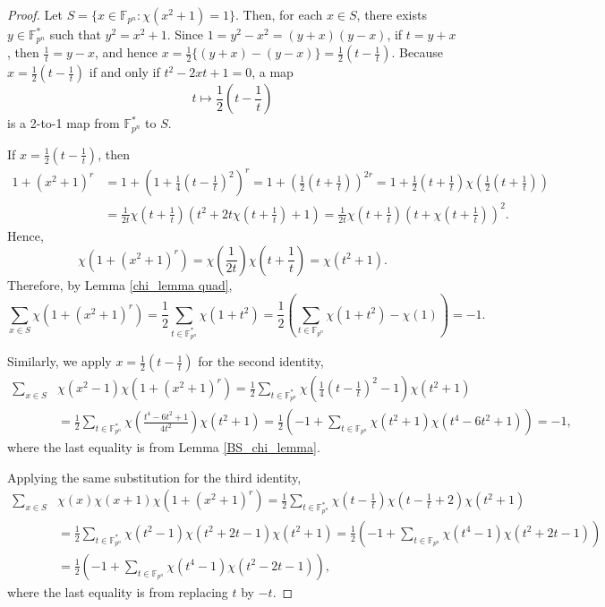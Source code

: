 \documentclass[11pt]{article}
\numberwithin{theorem}{section}
\newcommand{\Sum}{\displaystyle \sum}
\newcommand{\Fpn}{\mathbb{F}_{p^n}}
\newcommand{\Fpnmul}{\mathbb{F}_{p^n}^*}
\begin{document}
\begin{proof}
	Let $S=\{x\in \Fpn : \chi(x^2+1)=1\}$. Then, for each $x\in S$, there exists $y\in \Fpnmul$ such that $y^2 = x^2+1$. Since $1=y^2-x^2 = (y+x)(y-x)$, if $t=y+x$, then $\frac{1}{t} = y-x$, and hence $x = \frac{1}{2}\{(y+x)-(y-x)\} = \frac{1}{2}\left( t - \frac{1}{t}\right)$. Because $x= \frac{1}{2}\left( t - \frac{1}{t}\right)$ if and only if $t^2-2xt+1=0$, a map 
	$$t \mapsto \frac{1}{2}\left( t - \frac{1}{t}\right)$$
	is a 2-to-1 map from $\Fpnmul$ to $S$.
	
	If $x= \frac{1}{2}\left( t - \frac{1}{t}\right)$, then
	\begin{align*}
		1 + (x^2+1)^r &= 1 +\left( 1+\frac{1}{4}\left( t - \frac{1}{t}\right)^2\right)^r 
		= 1 +\left( \frac{1}{2}\left( t + \frac{1}{t }\right) \right)^{2r} =  1 +\frac{1}{2}\left( t + \frac{1}{t}\right)\chi\left( \frac{1}{2}\left( t + \frac{1}{t }\right)\right) \\
		& = \frac{1}{2t}\chi\left( t + \frac{1}{t }\right)\left( t^2 +2t\chi\left( t + \frac{1}{t }\right) +1 \right)  = \frac{1}{2t}\chi\left( t + \frac{1}{t }\right) \left( t+\chi\left( t + \frac{1}{t }\right)\right) ^2.
	\end{align*}
	Hence,
	\begin{equation*}
		\chi\left(1 + (x^2+1)^r \right)  = \chi \left( \frac{1}{2t}\right) \chi\left( t + \frac{1}{t }\right)  = \chi (t^2+1).
	\end{equation*}
	Therefore, by Lemma \ref{chi_lemma quad},
	\begin{equation*}
		\Sum_{x\in S}\chi(1+(x^2+1)^r) =  \frac{1}{2}\Sum_{t\in \Fpnmul}\chi(1+t^2) = \frac{1}{2}\left( \Sum_{t\in \Fpn}\chi(1+t^2) - \chi(1)\right) =-1.
	\end{equation*}
	
	Similarly, we apply $x =  \frac{1}{2 }\left( t- \frac {1}{t}\right)$ for the second identity,
	\begin{align*}
		\Sum_{x\in S}&\chi(x^2-1)\chi(1+(x^2+1)^r) = \frac{1}{2}\Sum_{t\in \Fpnmul} \chi\left( \frac{1}{4}\left( t- \frac {1}{t}\right) ^2-1\right)  \chi(t^2+1) \\
		&= \frac{1}{2}\Sum_{t\in \Fpnmul} \chi\left(\frac{t^4-6t^2+1}{4t^2} \right)\chi(t^2+1)
		= \frac{1}{2}\left( -1+\Sum_{t\in \Fpn} \chi(t^2+1) \chi(t^4-6t^2+1) \right)=-1, 
	\end{align*}
	where the last equality is from Lemma \ref{BS_chi_lemma}.
	
	Applying the same substitution for the third identity,
	\begin{align*}
		\Sum_{x\in S}&\chi(x)\chi(x+1)\chi(1+(x^2+1)^r) = \frac{1}{2}\Sum_{t\in \Fpnmul} \chi\left( t- \frac {1}{t}\right) \chi\left( t- \frac {1}{t}+2\right) \chi(t^2+1) \\
		&= \frac{1}{2}\Sum_{t\in \Fpnmul} \chi(t^2-1) \chi(t^2+2t-1) \chi(t^2+1)
		= \frac{1}{2}\left( -1+\Sum_{t\in \Fpn} \chi(t^4-1) \chi(t^2+2t-1) \right)\\
		&= \frac{1}{2}\left( -1+\Sum_{t\in \Fpn} \chi(t^4-1) \chi(t^2-2t-1) \right), 
	\end{align*}
	where the last equality is from replacing $t$ by $-t$.
\end{proof}
\end{document}
